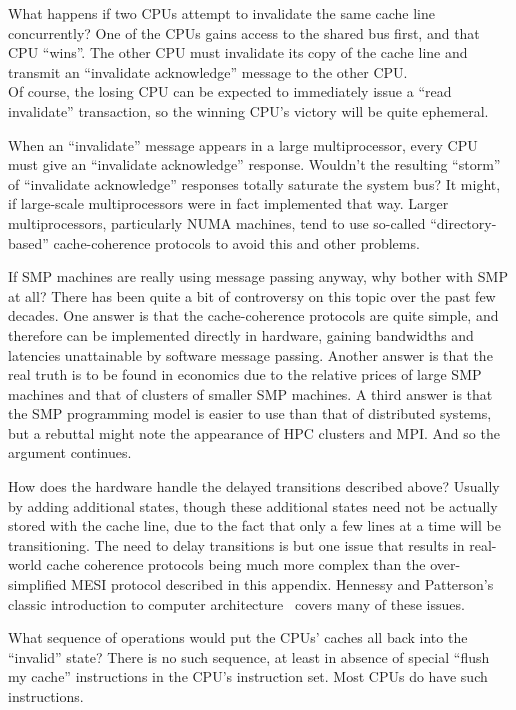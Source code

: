 \QuickQ{}
	What happens if two CPUs attempt to invalidate the
	same cache line concurrently?
\QuickA{}One of the CPUs gains access
	to the shared bus first,
	and that CPU ``wins''.  The other CPU must invalidate its copy of the
	cache line and transmit an ``invalidate acknowledge'' message
	to the other CPU. \\
	Of course, the losing CPU can be expected to immediately issue a
	``read invalidate'' transaction, so the winning CPU's victory will
	be quite ephemeral.

\QuickQ{}
	When an ``invalidate'' message appears in a large multiprocessor,
	every CPU must give an ``invalidate acknowledge'' response.
	Wouldn't the resulting ``storm'' of ``invalidate acknowledge''
	responses totally saturate the system bus?
\QuickA{}
	It might, if large-scale multiprocessors were in fact implemented
	that way.  Larger multiprocessors, particularly NUMA machines,
	tend to use so-called ``directory-based'' cache-coherence
	protocols to avoid this and other problems.

\QuickQ{}
	If SMP machines are really using message passing
	anyway, why bother with SMP at all?
\QuickA{}
	There has been quite a bit of controversy on this topic over
	the past few decades.  One answer is that the cache-coherence
	protocols are quite simple, and therefore can be implemented
	directly in hardware, gaining bandwidths and latencies
	unattainable by software message passing.  Another answer is that
	the real truth is to be found in economics due to the relative
	prices of large SMP machines and that of clusters of smaller
	SMP machines.  A third answer is that the SMP programming
	model is easier to use than that of distributed systems, but
	a rebuttal might note the appearance of HPC clusters and MPI.
	And so the argument continues.

\QuickQ{}
	How does the hardware handle the delayed transitions
	described above?
\QuickA{}
	Usually by adding additional states, though these additional
	states need not be actually stored with the cache line, due to
	the fact that only a few lines at a time will be transitioning.
	The need to delay transitions is but one issue that results in
	real-world cache coherence protocols being much more complex than
	the over-simplified MESI protocol described in this appendix.
	Hennessy and Patterson's classic introduction to computer
	architecture~\cite{Hennessy95a} covers many of these issues.

\QuickQ{}
	What sequence of operations would put the CPUs' caches
	all back into the ``invalid'' state?
\QuickA{}
	There is no such sequence, at least in absence of special
	``flush my cache'' instructions in the CPU's instruction set.
	Most CPUs do have such instructions.

